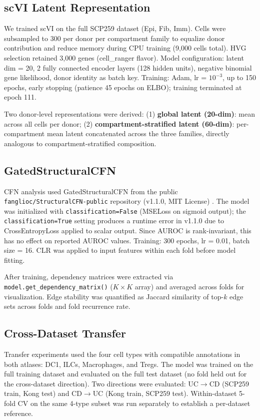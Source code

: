 \documentclass[11pt,letterpaper]{article}
\begin{document}
\subsection{scVI Latent Representation}

We trained scVI \citep{lopez2018deep} on the full SCP259 dataset (Epi, Fib,
Imm). Cells were subsampled to 300 per donor per compartment family to equalize
donor contribution and reduce memory during CPU training (9,000 cells total).
HVG selection retained 3,000 genes (cell\_ranger flavor). Model configuration:
latent dim = 20, 2 fully connected encoder layers (128 hidden units),
negative binomial gene likelihood, donor identity as batch key. Training:
Adam, lr = $10^{-3}$, up to 150 epochs, early stopping (patience 45 epochs on
ELBO); training terminated at epoch 111.

Two donor-level representations were derived: (1) \textbf{global latent
(20-dim)}: mean across all cells per donor; (2) \textbf{compartment-stratified
latent (60-dim)}: per-compartment mean latent concatenated across the three
families, directly analogous to compartment-stratified composition.

\subsection{GatedStructuralCFN}

CFN analysis used GatedStructuralCFN from the public
\texttt{fanglioc/StructuralCFN-public} repository (v1.1.0, MIT License)
\citep{li2023structural}. The model was initialized with
\texttt{classification=False} (MSELoss on sigmoid output); the
\texttt{classification=True} setting produces a runtime error in v1.1.0 due to
CrossEntropyLoss applied to scalar output. Since AUROC is rank-invariant,
this has no effect on reported AUROC values. Training: 300 epochs, lr = 0.01,
batch size = 16. CLR was applied to input features within each fold before
model fitting.

After training, dependency matrices were extracted via
\texttt{model.get\_dependency\_matrix()} ($K\times K$ array) and averaged
across folds for visualization. Edge stability was quantified as Jaccard
similarity of top-$k$ edge sets across folds and fold recurrence rate.

\subsection{Cross-Dataset Transfer}

Transfer experiments used the four cell types with compatible annotations in
both atlases: DC1, ILCs, Macrophages, and Tregs. The model was trained on the
full training dataset and evaluated on the full test dataset (no fold held
out for the cross-dataset direction). Two directions were evaluated:
UC$\rightarrow$CD (SCP259 train, Kong test) and CD$\rightarrow$UC (Kong train,
SCP259 test). Within-dataset 5-fold CV on the same 4-type subset was run
separately to establish a per-dataset reference.
\end{document}
